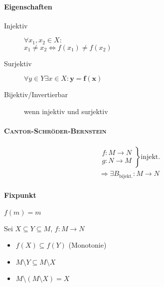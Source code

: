 \paragraph{Eigenschaften}

\begin{mzImportant}
  \begin{description}
    \item [Injektiv]
          $\forall x_1, x_2 \in X:$ \\
          $x_1 \boldsymbol{\neq} x_2 \Leftrightarrow f(x_1) \boldsymbol{\neq} f(x_2)$

    \item [Surjektiv]
          $\forall y \in Y \exists x \in X: \mathbf{y = f(x)}$

    \item [Bijektiv/Invertierbar]
          wenn injektiv und surjektiv
  \end{description}
\end{mzImportant}

\paragraph{\textsc{Cantor-Schröder-Bernstein}}

\begin{gather*}
  \left.\begin{array}{l}
    f: M \rightarrow N \\
    g: N \rightarrow M
  \end{array}\right\} \text{injekt.}\\ \Rightarrow \exists B_\text{bijekt.}: M \rightarrow N
\end{gather*}

\paragraph{Fixpunkt}
$f(m) = m$

Sei $X \subseteq Y \subseteq M$, $f: M \rightarrow N$

\begin{itemize}
  \item $f(X) \subseteq f(Y)$ (Monotonie)
  \item $M \setminus Y \subseteq M \setminus X$
  \item $M \setminus (M \setminus X) = X$
\end{itemize}

